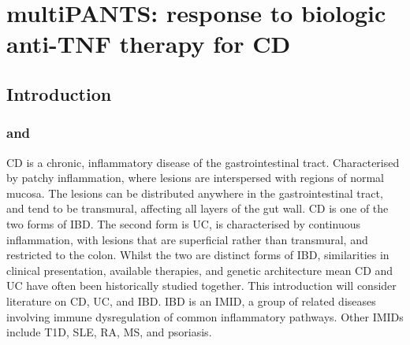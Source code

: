 %
%

\chapter{multiPANTS: response to biologic anti-TNF therapy for CD}


\begin{outline}

\section{Introduction}

\subsection{ and }

\gls{CD} is a chronic, inflammatory disease of the gastrointestinal tract.
Characterised by patchy inflammation, where lesions are interspersed with regions of normal mucosa. 
The lesions can be distributed anywhere in the gastrointestinal tract, and tend to be transmural, affecting all layers of the gut wall.
\gls{CD} is one of the two forms of \gls{IBD}.
The second form is \gls{UC}, is characterised by continuous inflammation, with lesions that are superficial rather than transmural, and restricted to the colon\autocite{roda2020CrohnDisease}.
Whilst the two are distinct forms of \gls{IBD}, similarities in clinical presentation, available therapies, and genetic architecture mean \gls{CD} and \gls{UC} have often been historically studied together.
This introduction will consider literature on \gls{CD}, \gls{UC}, and \gls{IBD}.
\gls{IBD} is an \gls{IMID}, a group of related diseases involving immune dysregulation of common inflammatory pathways.
Other \glspl{IMID} include \gls{T1D}, \gls{SLE}, \gls{RA}, \gls{MS}, and psoriasis\autocite{cotsapas2013ImmunemediatedDiseaseGenetics,david2018GeneticsImmunemediatedInflammatory}.


\end{outline}
